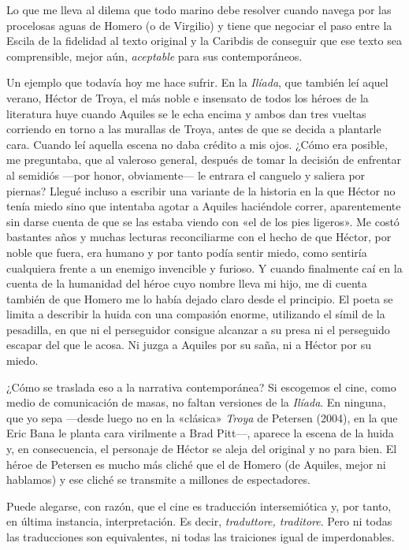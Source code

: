 Lo que me lleva al dilema que todo marino debe resolver cuando navega por las procelosas aguas de Homero (o de Virgilio) y tiene que negociar el paso entre la Escila de la fidelidad al texto original y la Caribdis de conseguir que ese texto sea comprensible, mejor aún, \emph{aceptable} para sus contemporáneos.

Un ejemplo que todavía hoy me hace sufrir. En la \emph{Ilíada}, que también leí aquel verano, Héctor de Troya, el más noble e insensato de todos los héroes de la literatura huye cuando Aquiles se le echa encima y ambos dan tres vueltas corriendo en torno a las murallas de Troya, antes de que se decida a plantarle cara. Cuando leí aquella escena no daba crédito a mis ojos. ¿Cómo era posible, me preguntaba, que al valeroso general, después de tomar la decisión de enfrentar al semidiós ---por honor, obviamente--- le entrara el canguelo y saliera por piernas? Llegué incluso a escribir una variante de la historia en la que Héctor no tenía miedo sino que intentaba agotar a Aquiles haciéndole correr, aparentemente sin darse cuenta de que se las estaba viendo con «el de los pies ligeros». Me costó bastantes años y muchas lecturas reconciliarme con el hecho de que Héctor, por noble que fuera, era humano y por tanto podía sentir miedo, como sentiría cualquiera frente a un enemigo invencible y furioso. Y cuando finalmente caí en la cuenta de la humanidad del héroe cuyo nombre lleva mi hijo, me di cuenta también de que Homero me lo había dejado claro desde el principio. El poeta se limita a describir la huida con una compasión enorme, utilizando el símil de la pesadilla, en que ni el perseguidor consigue alcanzar a su presa ni el perseguido escapar del que le acosa. Ni juzga a Aquiles por su saña, ni a Héctor por su miedo. 

¿Cómo se traslada eso a la narrativa contemporánea? Si escogemos el cine, como medio de comunicación de masas, no faltan versiones de la \emph{Ilíada}. En ninguna, que yo sepa ---desde luego no en la «clásica» \emph{Troya} de Petersen (2004), en la que Eric Bana le planta cara virilmente a Brad Pitt---, aparece la escena de la huida y, en consecuencia, el personaje de Héctor se aleja del original y no para bien. El héroe de Petersen es mucho más cliché que el de Homero (de Aquiles, mejor ni hablamos) y ese cliché se transmite a millones de espectadores. 

Puede alegarse, con razón, que el cine es traducción intersemiótica y, por tanto, en última instancia, interpretación. Es decir, \emph{traduttore, traditore}. Pero ni todas las traducciones son equivalentes, ni todas las traiciones igual de imperdonables. 
	
